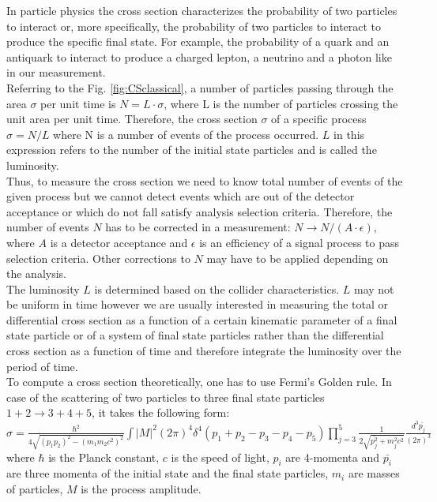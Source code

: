 In particle physics the cross section characterizes the probability of two particles to interact or, more specifically, the probability of two particles to interact to produce the specific final state. For example, the probability of a quark and an antiquark to interact to produce a charged lepton, a neutrino and a photon like in our measurement.\\

Referring to the Fig. \ref{fig:CSclassical}, a number of particles passing through the area $\sigma$ per unit time is $N=L \cdot \sigma$, where L is the number of particles crossing the unit area per unit time. Therefore, the cross section $\sigma$ of a specific process $\sigma=N/L$ where N is a number of events of the process occurred. $L$ in this expression refers to the number of the initial state particles and is called the luminosity. \\
  
Thus, to measure the cross section we need to know total number of events of the given process but we cannot detect events which are out of the detector acceptance or which do not fall satisfy analysis selection criteria. Therefore, the number of events $N$ has to be corrected in a measurement: $N \rightarrow N/(A \cdot \epsilon)$, where $A$ is a detector acceptance and $\epsilon$ is an efficiency of a signal process to pass selection criteria. Other corrections to $N$ may have to be applied depending on the analysis.\\

The luminosity $L$ is determined based on the collider characteristics. $L$ may not be uniform in time however we are usually interested in measuring the total or differential cross section as a function of a certain kinematic parameter of a final state particle or of a system of final state particles rather than the differential cross section as a function of time and therefore integrate the luminosity over the period of time.\\

To compute a cross section theoretically, one has to use Fermi's Golden rule. In case of the scattering of two particles to three final state particles $1+2\rightarrow 3+4+5$, it takes the following form:\\

$\sigma = \frac{ \hbar^2 }{4\sqrt{(p_1p_2)^2-(m_1m_2c^2)^2}} \int |M|^2 (2\pi)^4 \delta^4(p_1+p_2-p_3-p_4-p_5) \prod_{j=3}^{5} \frac{1}{2 \sqrt{\bar{p_j^2}+m_j^2 c^2}}\frac{d^3\bar{p_j}}{(2\pi)^3} $ \\ 
where $\hbar$ is the Planck constant, $c$ is the speed of light, $p_i$ are 4-momenta and ${\bar{p_i}}$ are three momenta of the initial state and the final state particles, $m_i$ are masses of particles, $M$ is the process amplitude.\\ 

